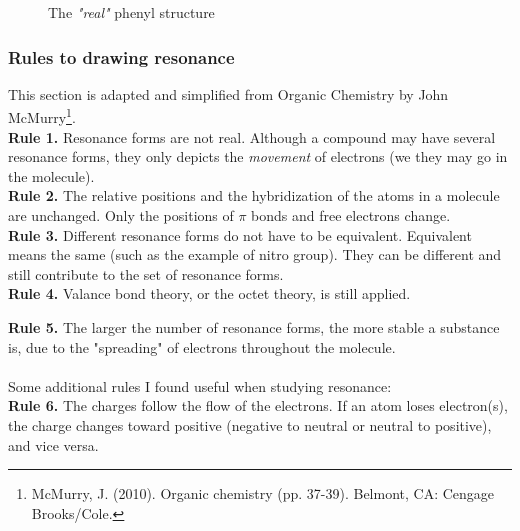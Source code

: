 \documentclass{report}
\begin{document}
		\begin{figure}[H]
		 \centering
		 \captionsetup{justification=centering, margin=2cm}
		\caption{The \textit{"real"}	phenyl structure}
		 \end{figure}
		
			\subsubsection{Rules to drawing resonance}
		This section is adapted and simplified from Organic Chemistry by John McMurry\footnote{McMurry, J. (2010). Organic chemistry (pp. 37-39). Belmont, CA: Cengage Brooks/Cole.}. \\
		
		\textbf{Rule 1.} Resonance forms are not real. Although a compound may have several resonance forms, they only depicts the \textit{movement} of electrons (we they may go in the molecule). \\
		
		\textbf{Rule 2.} The relative positions and the hybridization of the atoms in a molecule are unchanged. Only the positions of $\pi$ bonds and free electrons change. \\
		
		\textbf{Rule 3.} Different resonance forms do not have to be equivalent. Equivalent means the same (such as the example of nitro group). They can be different and still contribute to the set of resonance forms. \\
		
		\textbf{Rule 4.} Valance bond theory, or the octet theory, is still applied. \\
		
		\begin{center}
		\end{center}
		
		\textbf{Rule 5.} The larger the number of resonance forms, the more stable a substance is, due to the "spreading" of electrons throughout the molecule. \\
		\\
		Some additional rules I found useful when studying resonance: \\
		
		\textbf{Rule 6.} The charges follow the flow of the electrons. If an atom loses electron(s), the charge changes toward positive (negative to neutral or neutral to positive), and vice versa. \\
		
\end{document}
